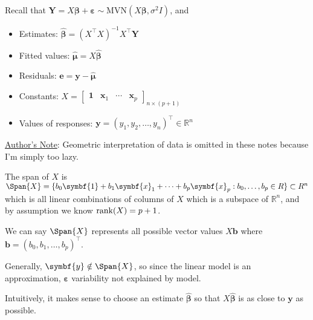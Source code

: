 Recall that $ \symbf{Y}=X\symbf{\beta}+\symbf{\varepsilon}
    \sim \text{MVN}(X\symbf{\beta},\sigma^2 I) $, and
\begin{itemize}
    \item Estimates: $ \hat{\symbf{\beta}}=(X^\top X)^{-1}X^\top \symbf{Y} $
    \item Fitted values: $ \hat{\symbf{\mu}}=X\hat{\symbf{\beta}} $
    \item Residuals: $ \symbf{e}=\symbf{y}-\hat{\symbf{\mu}} $
    \item Constants: $ X=\begin{bmatrix}
                  \symbf{1} & \symbf{x}_1 & \cdots & \symbf{x}_p
              \end{bmatrix}_{n\times(p+1)} $
    \item Values of responses: $
              \symbf{y}=(y_1,y_2,\ldots,y_n)^\top \in\mathbb{R}^n $
\end{itemize}
\underline{Author's Note}: Geometric interpretation of data is omitted in these notes because
I'm simply too lazy.

The span of $ X $ is $ \Span{X}=
    \set{b_0\symbf{1}+b_1\symbf{x}_1+\cdots+b_p\symbf{x}_p:b_0,\ldots,b_p\in\mathbb{R}}
    \subset \mathbb{R}^n $
which is all linear combinations of columns of $ X $ which is a subspace
of $ \mathbb{R}^n $, and by assumption we know $ \operatorname{rank}(X)=p+1 $.

We can say $ \Span{X} $ represents all possible vector
values $ X\symbf{b} $ where $ \symbf{b}=(b_0,b_1,\ldots,b_p)^\top $.

Generally, $ \symbf{y}\notin\Span{X} $, so since
the linear model is an approximation, $ \symbf{\varepsilon} $
variability not explained by model.

Intuitively, it makes sense to choose an estimate
$ \hat{\symbf{\beta}} $ so that $ X\hat{\symbf{\beta}} $
is as close to $ \symbf{y} $ as possible.

